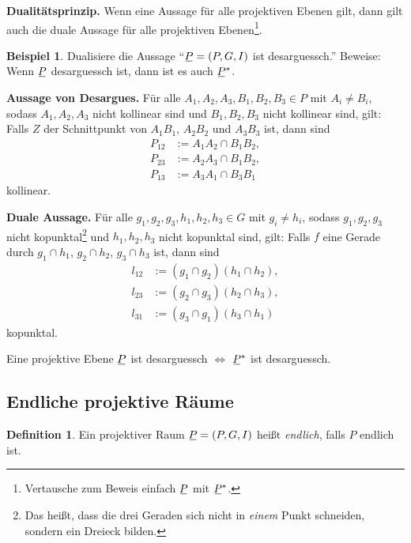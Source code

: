 \documentclass[
 a4paper,
 12pt,
 parskip=half
 ]{scrartcl}
\theoremstyle{plain}
\theoremstyle{definition}
\newtheorem*{exmp*}{Beispiel}
\newtheorem*{defn*}{Definition}
\begin{document}
\textbf{Dualitätsprinzip.} Wenn eine Aussage für alle projektiven Ebenen gilt, dann gilt auch die duale Aussage für alle projektiven Ebenen\footnote{Vertausche zum Beweis einfach $\proj$ mit $\proj^*$.}.

\begin{exmp*}
 Dualisiere die Aussage ``$\proj = (P,G,I)$ ist desarguessch.'' Beweise: Wenn $\proj$ desarguessch ist, dann ist es auch $\proj^*$.
 
 \begin{addmargin}[.5cm]{0cm} 
 \textbf{Aussage von Desargues.} Für alle $A_1, A_2, A_3, B_1, B_2, B_3 \in P$ mit $A_i \ne B_i$, sodass $A_1, A_2, A_3$ nicht kollinear sind und $B_1, B_2, B_3$ nicht kollinear sind, gilt: Falls $Z$ der Schnittpunkt von $A_1 B_1$, $A_2 B_2$ und $A_3 B_3$ ist, dann sind 
 \begin{align*}
  P_{12} &:= A_1 A_2 \cap B_1 B_2, \\
  P_{23} &:= A_2 A_3 \cap B_1 B_2, \\
  P_{13} &:= A_3 A_1 \cap B_3 B_1 
 \end{align*}
 kollinear.
 
 \textbf{Duale Aussage.} Für alle $g_1, g_2, g_3, h_1, h_2, h_3 \in G$ mit $g_i \ne h_i$, sodass $g_1, g_2, g_3$ nicht kopunktal\footnote{Das heißt, dass die drei Geraden sich nicht in \emph{einem} Punkt schneiden, sondern ein Dreieck bilden.} und $h_1, h_2, h_3$ nicht kopunktal sind, gilt: Falls $f$ eine Gerade durch $g_1 \cap h_1$, $g_2 \cap h_2$, $g_3 \cap h_3$ ist, dann sind
 \begin{align*}
  l_{12} &:= (g_1 \cap g_2)(h_1 \cap h_2), \\
  l_{23} &:= (g_2 \cap g_3)(h_2 \cap h_3), \\
  l_{31} &:= (g_3 \cap g_1)(h_3 \cap h_1 )
 \end{align*}
 kopunktal.
 \end{addmargin}
\end{exmp*}

\setcounter{thm}{5}
\begin{thm}
 Eine projektive Ebene $\proj$ ist desarguessch $\Leftrightarrow$ $\proj^*$ ist desarguessch.
\end{thm}

\subsection{Endliche projektive Räume}

\begin{defn*}
 Ein projektiver Raum $\proj = (P,G,I)$ heißt \emph{endlich}, falls $P$ endlich ist.
\end{defn*}
\end{document}
